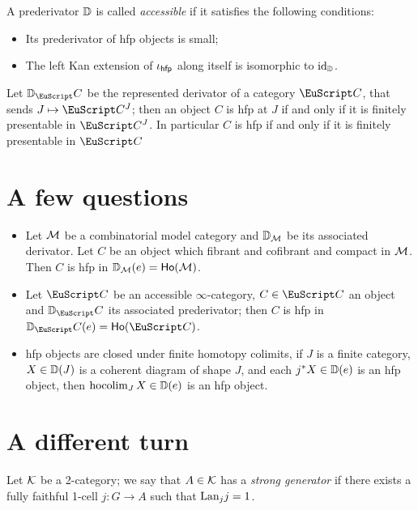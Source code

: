 \documentclass[a4paper,11pt]{amsart}
\def\hfp{{\sf hfp}}
\begin{document}
\begin{definition}
A prederivator $\mathbb{D}$ is called \emph{accessible} if it satisfies the following conditions:
\begin{itemize}
	\item Its prederivator of hfp objects is small;
	\item The left Kan extension of $\iota_\hfp$ along itself is isomorphic to $\operatorname{id}_{\mathbb{D}}$.
\end{itemize}
\end{definition}
\begin{remark}
Let $\D_\iC$ be the represented derivator of a category $\iC$, that sends $J\mapsto \iC^J$; then an object $C$ is hfp at $J$ if and only if it is finitely presentable in $\iC^J$. In particular $C$ is hfp if and only if it is finitely presentable in $\iC$
\end{remark}
\section{A few questions}
\begin{itemize}
	\item Let $\mathcal{M}$ be a combinatorial model category and $\mathbb{D}_{\mathcal{M}}$ be its associated derivator. Let $C$ be an object which fibrant and cofibrant and compact in $\mathcal{M}$. Then $C$ is hfp in $\mathbb{D}_{\mathcal{M}}(e) = \textsf{Ho}(\mathcal{M})$.
	\item Let $\iC$ be an accessible $\infty$-category, $C\in\iC$ an object and $\D_\iC$ its associated prederivator; then $C$ is hfp in $\D_\iC(e)=\ho(\iC)$.
	\item hfp objects are closed under finite homotopy colimits, \ie if $J$ is a finite category, $X\in\mathbb{D}(J)$ is a coherent diagram of shape $J$, and each $j^*X\in\mathbb{D}(e)$ is an hfp object, then $\operatorname{hocolim}_J X \in\mathbb{D}(e)$ is an hfp object.
\end{itemize}
\cleardoublepage

\section{A different turn}
Let $\mathcal{K}$ be a 2-category; we say that $A\in \mathcal{K}$ has a \emph{strong generator} if there exists a fully faithful 1-cell $j : G \to A$ such that $\text{Lan}_jj = 1$.
\end{document}
